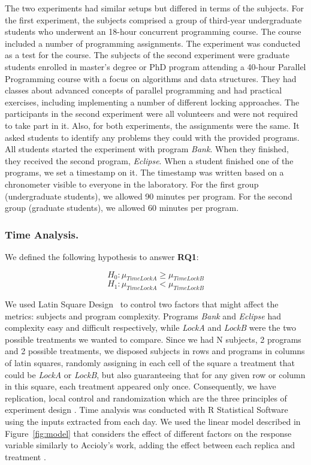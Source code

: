 The two experiments had similar setups but differed in terms of the subjects. For the first experiment, the subjects comprised a group of third-year undergraduate students who underwent an 18-hour concurrent programming course. The course included a number of programming assignments. The experiment was conducted as a test for the course. The subjects of the second experiment were  graduate students enrolled in master's degree or PhD program attending a 40-hour Parallel Programming course with a focus on algorithms and data structures. They had classes about advanced concepts of parallel programming and had practical exercises, including implementing a number of different locking approaches. The participants in the second experiment were all volunteers and were not required to take part in it. Also, for both experiments, the assignments were the same. It asked students to identify any problems they could with the provided programs. All students started the experiment with program \emph{Bank}. When they finished, they received the second program, \emph{Eclipse}. When a student finished one of the programs, we set a timestamp on it. The timestamp was written based on a chronometer visible to everyone in the laboratory. For the first group (undergraduate students), we allowed 90 minutes per program. For the second group (graduate students), we allowed 60 minutes per program. 

\subsubsection{Time Analysis.}

We defined the following hypothesis to answer {\bf RQ1}:

\begin{equation}
  H_{0} : \mu_{TimeLockA} \geq \mu_{TimeLockB}
\end{equation}
\begin{equation}
  H_{1} : \mu_{TimeLockA} < \mu_{TimeLockB}
\end{equation}

We used Latin Square Design~\cite{box} to control two factors that might affect the metrics: subjects and program complexity.
Programs \emph{Bank} and \emph{Eclipse} had complexity easy and difficult respectively, while \emph{LockA} and \emph{LockB} were the two possible treatments we wanted to compare.
Since we had N subjects, 2 programs and 2 possible treatments, we disposed subjects in rows and programs in columns of latin squares, randomly assigning in each cell of the square a treatment that could be \emph{LockA} or \emph{LockB}, but also guaranteeing that for any given row or column in this square, each treatment appeared only once. Consequently, we have replication, local control and randomization which are the three principles of experiment design \cite{box}. Time analysis was conducted with R Statistical Software using the inputs extracted from each day. We used the linear model described in Figure~\ref{fig:model} that considers the effect of different factors on the response variable similarly to Accioly's work\cite{paola}, adding the effect between each replica and treatment \cite{sanchez}.

